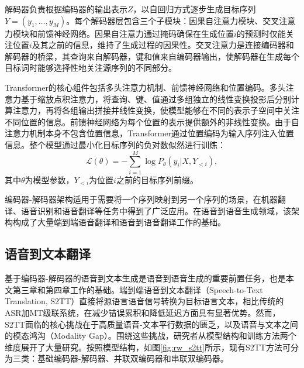 \begin{figure}[htbp]
\label{fig:rw_transformer}
\end{figure}

解码器负责根据编码器的输出表示$Z$，以自回归方式逐步生成目标序列$Y=(y_1,\ldots,y_M)$。每个解码器层包含三个子模块：因果自注意力模块、交叉注意力模块和前馈神经网络。因果自注意力通过掩码确保在生成位置$i$的预测时仅能关注位置$i$及其之前的信息，维持了生成过程的因果性。交叉注意力是连接编码器和解码器的桥梁，其查询来自解码器，键和值来自编码器输出，使解码器在生成每个目标词时能够选择性地关注源序列的不同部分。

Transformer的核心组件包括多头注意力机制、前馈神经网络和位置编码。多头注意力基于缩放点积注意力，将查询、键、值通过多组独立的线性变换投影后分别计算注意力，再将各组输出拼接并线性变换，使模型能够在不同的表示子空间中关注不同位置的信息。前馈神经网络为每个位置的表示提供额外的非线性变换。由于自注意力机制本身不包含位置信息，Transformer通过位置编码为输入序列注入位置信息。整个模型通过最小化目标序列的负对数似然进行训练：
\begin{equation}
\mathcal{L}(\theta)=-\sum_{i=1}^{M}\log P_\theta(y_i|X,Y_{<i}),
\end{equation}
其中$\theta$为模型参数，$Y_{<i}$为位置$i$之前的目标序列前缀。

编码器-解码器架构适用于需要将一个序列映射到另一个序列的场景，在机器翻译、语音识别和语音翻译等任务中得到了广泛应用。在语音到语音生成领域，该架构构成了大量端到端语音翻译和语音到语音翻译工作的基础。


\subsection{语音到文本翻译}\label{sec:rw_encdec_s2tt}

基于编码器-解码器的语音到文本生成是语音到语音生成的重要前置任务，也是本文第三章和第四章工作的基础。端到端语音到文本翻译（Speech-to-Text Translation, S2TT）直接将源语言语音信号转换为目标语言文本，相比传统的ASR加MT级联系统，在减少错误累积和降低延迟方面具有显著优势。然而，S2TT面临的核心挑战在于高质量语音-文本平行数据的匮乏，以及语音与文本之间的模态鸿沟（Modality Gap）。围绕这些挑战，研究者从模型结构和训练方法两个维度展开了大量研究。按照模型结构，如图\ref{fig:rw_s2tt}所示，现有S2TT方法可分为三类：基础编码器-解码器、并联双编码器和串联双编码器。

